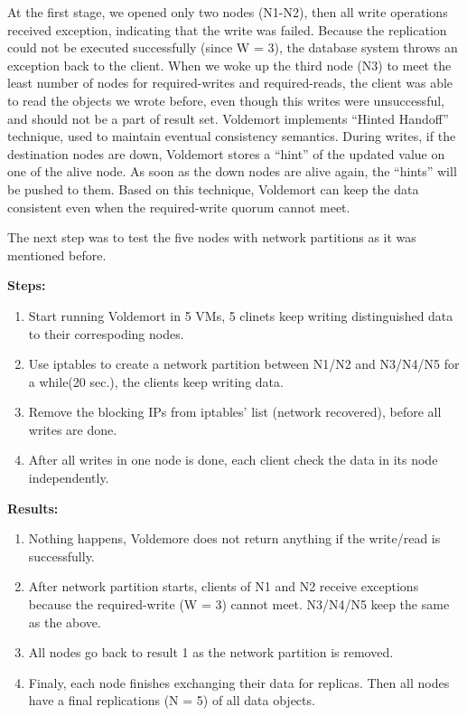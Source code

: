 \documentclass[a4paper]{article}
\begin{document}
At the first stage, we opened only two nodes (N1-N2), then all write operations received exception, indicating that the write was failed. 
Because the replication could not be executed successfully (since W = 3), the database system throws an exception back to the client. 
When we woke up the third node (N3) to meet the least number of nodes for required-writes and required-reads, the client was able to read the objects we wrote before, even though this writes were unsuccessful, and should not be a part of result set. 
Voldemort implements ``Hinted Handoff'' technique, used to maintain eventual consistency semantics. 
During writes, if the destination nodes are down, Voldemort stores a ``hint'' of the updated value on one of the alive node. 
As soon as the down nodes are alive again, the ``hints'' will be pushed to them. 
Based on this technique, Voldemort can keep the data consistent even when the required-write quorum cannot meet.

The next step was to test the five nodes with network partitions as it was mentioned before. 

{\bf Steps:}
\begin{enumerate}
  \item Start running Voldemort in 5 VMs, 5 clinets keep writing distinguished data to their correspoding nodes.
  \item Use iptables to create a network partition between N1/N2 and N3/N4/N5 for a while(20 sec.), the clients keep writing data.
  \item Remove the blocking IPs from iptables' list (network recovered), before all writes are done.
  \item After all writes in one node is done, each client check the data in its node independently.
\end{enumerate}

{\bf Results:}
\begin{enumerate}
  \item Nothing happens, Voldemore does not return anything if the write/read is successfully.
  \item After network partition starts, clients of N1 and N2 receive exceptions because the required-write (W = 3) cannot meet. N3/N4/N5 keep the same as the above. 
  \item All nodes go back to result 1 as the network partition is removed.
  \item Finaly, each node finishes exchanging their data for replicas. Then all nodes have a final replications (N = 5) of all data objects.
\end{enumerate}
\end{document}
